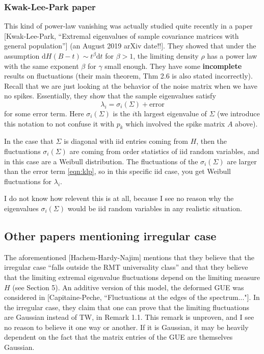 \documentclass[11 pt, reqno]{article}
\def\beq{\begin{equation}}
\def\eeq{\end{equation}}
\def\d{\mathrm{d}}
\begin{document}
\subsubsection{Kwak-Lee-Park paper}
This kind of power-law vanishing was actually studied quite recently in a paper [Kwak-Lee-Park, ``Extremal eigenvalues of sample covariance matrices with general population''] (an August 2019 arXiv date!!].  They showed that under the assumption $\d H (B-t) \sim t^\beta \d t $ for $\beta >1$, the limiting density $\rho$ has a power law with the same exponent $\beta$ for $\gamma$ small enough.  They have some {\bf incomplete} results on fluctuations (their main theorem, Thm 2.6 is also stated incorrectly).  Recall that we are just looking at the behavior of the noise matrix when we have no spikes.  Essentially, they show that the sample eigenvalues satisfy 
\beq \label{eqn:klp}
\lambda_i = \sigma_i ( \Sigma ) + \mbox{error}
\eeq
 for some error term.  Here $\sigma_i ( \Sigma)$ is the $i$th largest eigenvalue of $\Sigma$ (we introduce this notation to not confuse it with $p_k$ which involved the spike matrix $A$ above).

  In the case that $\Sigma$ is diagonal with iid entries coming from $H$, then the fluctuations $\sigma_i ( \Sigma)$ are coming from order statistics of iid random variables, and in this case are a Weibull distribution.  The fluctuations of the $\sigma_i ( \Sigma)$ are larger than the error term \eqref{eqn:klp}, so in this specific iid case, you get Weibull fluctuations for $\lambda_i$. 

 I do not know how relevent this is at all, because I see no reason why the eigenvalues $\sigma_i ( \Sigma)$ would be iid random variables in any realistic situation.


\subsection{Other papers mentioning irregular case}
 
The aforementioned [Hachem-Hardy-Najim] mentions that they believe that the irregular case ``falls outside the RMT universality class'' and that they believe that the limiting extremal eigenvalue fluctuations depend on the limiting measure $H$ (see Section 5). An additive version of this model, the deformed GUE was considered in [Capitaine-Peche, ``Fluctuations at the edges of the spectrum..."].  In the irregular case, they claim that one can prove that the limiting fluctuations are Gaussian instead of TW, in Remark 1.1.  This remark is unproven, and I see no reason to believe it one way or another.  If it is Gaussian, it may be heavily dependent on the fact that the matrix entries of the GUE are themselves Gaussian.
\end{document}
